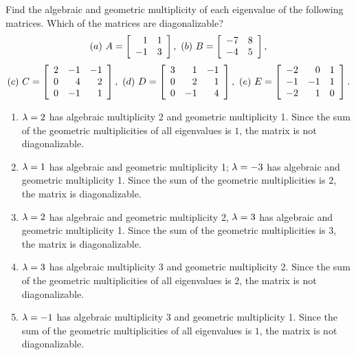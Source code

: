 \documentclass{ximera}
\author{Zack Reed}
\begin{document}
\begin{exercise}
  Find the algebraic and geometric multiplicity of each eigenvalue of
  the following matrices. Which of the matrices are diagonalizable?
  \begin{equation*}
    (a)\quad
    A = \startmat{rr} 1 & 1 \\ -1 & 3 \stopmat,
    \quad
    (b)\quad
    B = \startmat{rr} -7 & 8 \\ -4 & 5 \stopmat,
  \end{equation*}
  \begin{equation*}
    (c)\quad
    C = \startmat{rrr}
      2 & -1 & -1 \\
      0 & 4 & 2 \\
      0 & -1 & 1 \\
    \stopmat,
    \quad
    (d)\quad
    D = \startmat{rrr}
      3 & 1 & -1 \\
      0 & 2 & 1 \\
      0 & -1 & 4 \\
    \stopmat,
    \quad
    (e)\quad
    E = \startmat{rrr}
      -2 & 0 & 1 \\
      -1 & -1 & 1 \\
      -2 & 1 & 0 \\
    \stopmat.
  \end{equation*}
  \begin{solution}
    \begin{enumerate}
    \item $\eigenvar=2$ has algebraic multiplicity 2 and geometric
      multiplicity 1. Since the sum of the geometric multiplicities of
      all eigenvalues is $1$, the matrix is not diagonalizable.
    \item $\eigenvar=1$ has algebraic and geometric
      multiplicity 1; $\eigenvar=-3$ has algebraic and geometric
      multiplicity 1. Since the sum of the geometric multiplicities is
      $2$, the matrix is diagonalizable.
    \item $\eigenvar=2$ has algebraic and geometric
      multiplicity 2, $\eigenvar=3$ has algebraic and geometric
      multiplicity 1. Since the sum of the geometric multiplicities is
      $3$, the matrix is diagonalizable.
    \item $\eigenvar=3$ has algebraic multiplicity 3 and geometric
      multiplicity 2. Since the sum of the geometric multiplicities of
      all eigenvalues is $2$, the matrix is not diagonalizable.
    \item $\eigenvar = -1$ has algebraic multiplicity 3 and geometric
      multiplicity 1. Since the sum of the geometric multiplicities of
      all eigenvalues is $1$, the matrix is not diagonalizable.
    \end{enumerate}
  \end{solution}
\end{exercise}
\end{document}
